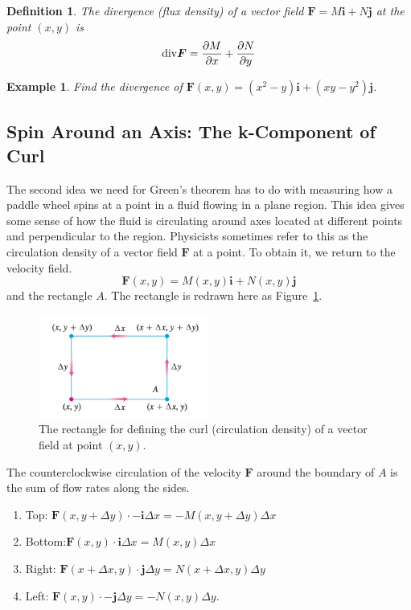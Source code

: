 \documentclass[a4paper,12pt]{article}
\newtheorem{example}{Example}             %
\newtheorem{definition}{Definition}
\begin{document}
\begin{CJK}{UTF8}{gbsn}
\begin{definition}
    The divergence (flux density) of a vector field $\bm{F} = M\bm{i} + N\bm{j}$ 
    at the point $(x,y)$ is 
    \[
        {\rm div} \bm{F} = \frac{\partial M}{\partial x} + \frac{\partial N}{\partial y}
    \]
\end{definition}
\begin{example}
    Find the divergence of $\bm{F}(x,y) = (x^2 - y)\bm{i} + (xy - y^2)\bm{j}$.
\end{example}

\subsection{Spin Around an Axis: The k-Component of Curl}
The second idea we need for Green's theorem has to do with measuring how 
a paddle wheel spins at a point in a fluid flowing in a plane region. This 
idea gives some sense of how the fluid is circulating around axes located 
at different points and perpendicular to the region. Physicists sometimes 
refer to this as the circulation density of a vector field $\bm{F}$ at a point.
To obtain it, we return to the velocity field.
\[
    \bm{F}(x,y) = M(x,y)\bm{i} + N(x,y)\bm{j} 
\]
and the rectangle $A$. The rectangle is redrawn here as Figure~\ref{fig:fig10}.
\begin{figure}[htbp]
    \centering 
    \includegraphics[height=0.3\textwidth, width=0.5\textwidth]{curl1.png}
    \caption{The rectangle for defining the curl (circulation density) 
    of a vector field at point $(x,y)$.}
    \label{fig:fig10}
\end{figure}

The counterclockwise circulation of the velocity $\bm{F}$ around the boundary 
of $A$ is the sum of flow rates along the sides.
\begin{enumerate}
    \item Top: $\bm{F}(x,y+\Delta y) \cdot \bm{-i} \Delta x = -M(x,y+\Delta y)\Delta x$
    \item Bottom:$\bm{F}(x,y) \cdot \bm{i} \Delta x = M(x,y)\Delta x$
    \item Right: $\bm{F}(x+\Delta x,y) \cdot \bm{j} \Delta y = N(x+\Delta x,y)\Delta y$
    \item Left: $\bm{F}(x,y) \cdot \bm{-j} \Delta y = -N(x,y)\Delta y.$
\end{enumerate}


\end{CJK}
\end{document}
